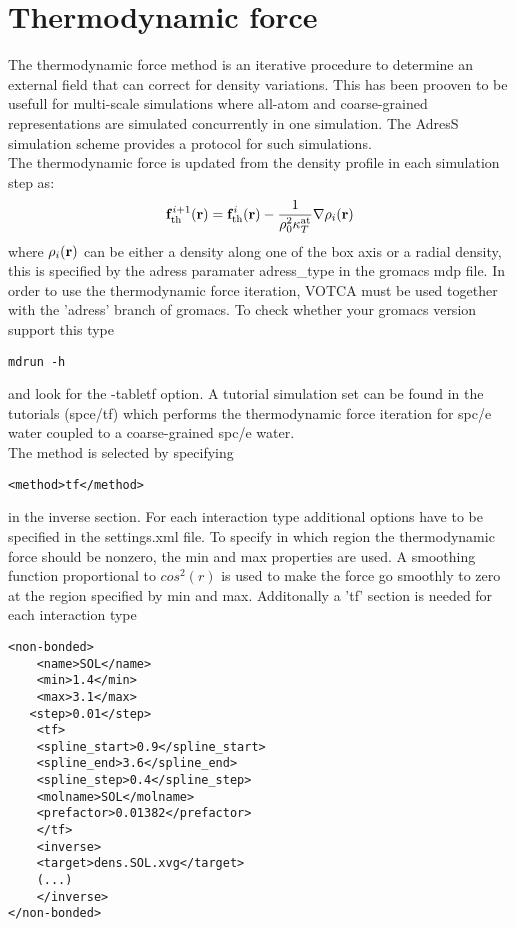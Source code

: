 \section{Thermodynamic force}
The thermodynamic force method is an iterative procedure to determine an external field that can correct for density variations. This has been prooven to be usefull for multi-scale simulations where all-atom and coarse-grained representations are simulated concurrently in one simulation. The AdresS simulation scheme provides a protocol for such simulations.\\
The thermodynamic force is updated from the density profile in each simulation step as:
\begin{equation}
{\bf f}_\text{th}^{i+1}({\bf r}) = {\bf f}_\text{th}^i({\bf r}) - \frac{1}{\rho_0^2 \kappa_T^\text{at}}\nabla \rho_i({\bf r})
\label{iterative_force_grad_dens}
\end{equation}
where $\rho_i({\bf r})$ can be either a density along one of the box axis or a radial density, this is specified by the adress paramater adress\_type in the gromacs mdp file.
In order to use the thermodynamic force iteration, VOTCA must be used together with the 'adress' branch of gromacs. To check whether your gromacs version support this type \begin{verbatim}mdrun -h \end{verbatim} and look for the -tabletf option.
A tutorial simulation set can be found in the tutorials (spce/tf) which performs the thermodynamic force iteration for spc/e water coupled to a coarse-grained spc/e water.\\
The method is selected by specifying
\begin{lstlisting}
<method>tf</method>
\end{lstlisting}
in the inverse section.
For each interaction type additional options have to be specified in the settings.xml file. To specify in which region the thermodynamic force should be nonzero, the min and max properties are used.
A smoothing function proportional to $cos^2(r)$ is used to make the force go smoothly to zero at the region specified by min and max.
Additonally a 'tf' section is needed for each interaction type
\begin{lstlisting}
<non-bonded>
    <name>SOL</name>
    <min>1.4</min>
    <max>3.1</max>
   <step>0.01</step>
    <tf>
	<spline_start>0.9</spline_start>
	<spline_end>3.6</spline_end>
	<spline_step>0.4</spline_step>
	<molname>SOL</molname>
	<prefactor>0.01382</prefactor>
    </tf>
    <inverse>
	<target>dens.SOL.xvg</target>
	(...)
    </inverse>
</non-bonded>
\end{lstlisting}
